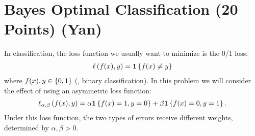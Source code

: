 \section{Bayes Optimal Classification (20 Points) (Yan)}

In classification, the loss function we usually want to minimize is the 0/1 loss:
\begin{align}
\ell\left( f(x), y \right) = \mathbf{1}\left\lbrace f(x) \neq y \right\rbrace
\end{align}
where $f(x), y \in \left\lbrace 0, 1 \right\rbrace$ (\ie, binary classification). In this problem we will consider the effect of using an asymmetric loss function:
\begin{align}
\ell_{\alpha, \beta} \left( f(x), y \right) = \alpha \mathbf{1} \left\lbrace f(x) = 1, y = 0 \right\rbrace + \beta \mathbf{1} \left\lbrace {f(x) = 0, y = 1} \right\rbrace.
\end{align}
Under this loss function, the two types of errors receive different weights, determined by $\alpha, \beta > 0$.

